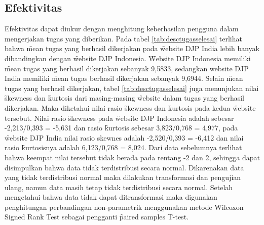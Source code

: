 \subsection{Efektivitas}
Efektivitas dapat diukur dengan menghitung keberhasilan pengguna dalam mengerjakan tugas yang diberikan. Pada tabel \ref{tab:desctugasselesai} terlihat bahwa \f{mean} tugas yang berhasil dikerjakan pada \f{website} DJP India lebih banyak dibandingkan dengan \f{website} DJP Indonesia. \f{Website} DJP Indonesia memiliki \f{mean} tugas yang berhasil dikerjakan sebanyak 9,5833, sedangkan website DJP India memiliki \f{mean} tugas berhasil dikerjakan sebanyak 9,6944. Selain \f{mean} tugas yang berhasil dikerjakan, tabel \ref{tab:desctugasselesai} juga menunjukan nilai \f{skewness} dan \f{kurtosis} dari masing-masing \f{website} dalam tugas yang berhasil dikerjakan. Maka diketahui nilai rasio \f{skewness} dan \f{kurtosis} pada kedua \f{website} tersebut. Nilai rasio \f{skewness} pada \f{website} DJP Indonesia adalah sebesar -2,213/0,393 = -5,631 dan rasio \f{kurtosis} sebesar 3,823/0,768 = 4,977, pada \f{website} DJP India nilai rasio skewnes adalah -2,520/0,393 = -6,412 dan nilai rasio \f{kurtosis}nya adalah 6,123/0,768 = 8,024. Dari data sebelumnya terlihat bahwa keempat nilai tersebut tidak berada pada rentang -2 dan 2, sehingga dapat disimpulkan bahwa data tidak terdistribusi secara normal. Dikarenakan data yang tidak terdistribusi normal maka dilakukan transformasi dan pengujian ulang, namun data masih tetap tidak terdistribusi secara normal. Setelah mengetahui bahwa data tidak dapat ditransformasi maka digunakan penghitungan perbandingan non-parametrik menggunakan metode \f{Wilcoxon Signed Rank Test} sebagai pengganti \f{paired samples T-test}.
